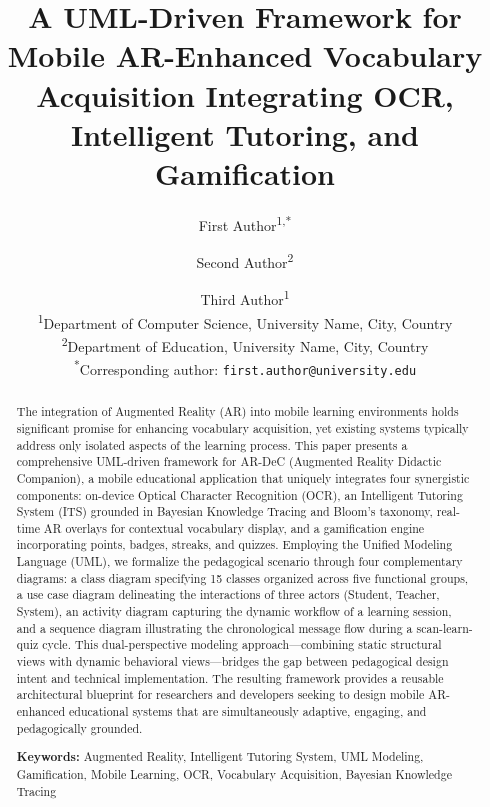 \documentclass[12pt]{article}
\title{
  \vspace{-1cm}
  \textbf{A UML-Driven Framework for Mobile AR-Enhanced Vocabulary Acquisition Integrating OCR, Intelligent Tutoring, and Gamification}
}
\author{
  First Author\textsuperscript{1,*} \and
  Second Author\textsuperscript{2} \and
  Third Author\textsuperscript{1} \\[6pt]
  \textsuperscript{1}Department of Computer Science, University Name, City, Country \\
  \textsuperscript{2}Department of Education, University Name, City, Country \\[4pt]
  \textsuperscript{*}Corresponding author: \texttt{first.author@university.edu}
}
\date{}
\begin{document}
\maketitle

\begin{abstract}
The integration of Augmented Reality (AR) into mobile learning environments holds significant promise for enhancing vocabulary acquisition, yet existing systems typically address only isolated aspects of the learning process. This paper presents a comprehensive UML-driven framework for AR-DeC (Augmented Reality Didactic Companion), a mobile educational application that uniquely integrates four synergistic components: on-device Optical Character Recognition (OCR), an Intelligent Tutoring System (ITS) grounded in Bayesian Knowledge Tracing and Bloom's taxonomy, real-time AR overlays for contextual vocabulary display, and a gamification engine incorporating points, badges, streaks, and quizzes. Employing the Unified Modeling Language (UML), we formalize the pedagogical scenario through four complementary diagrams: a class diagram specifying 15 classes organized across five functional groups, a use case diagram delineating the interactions of three actors (Student, Teacher, System), an activity diagram capturing the dynamic workflow of a learning session, and a sequence diagram illustrating the chronological message flow during a scan-learn-quiz cycle. This dual-perspective modeling approach---combining static structural views with dynamic behavioral views---bridges the gap between pedagogical design intent and technical implementation. The resulting framework provides a reusable architectural blueprint for researchers and developers seeking to design mobile AR-enhanced educational systems that are simultaneously adaptive, engaging, and pedagogically grounded.

\medskip
\noindent\textbf{Keywords:} Augmented Reality, Intelligent Tutoring System, UML Modeling, Gamification, Mobile Learning, OCR, Vocabulary Acquisition, Bayesian Knowledge Tracing
\end{abstract}

\tableofcontents
\newpage












\end{document}
